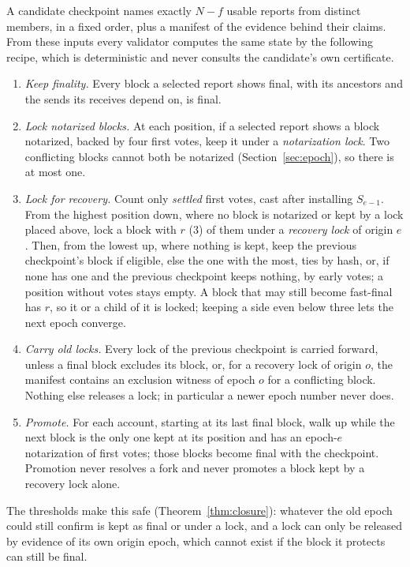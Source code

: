 A candidate checkpoint names exactly $N-f$ usable reports from distinct members, in a fixed order, plus a manifest of the evidence behind their claims. From these inputs every validator computes the same state by the following recipe, which is deterministic and never consults the candidate's own certificate.
\begin{enumerate}
\item \emph{Keep finality.} Every block a selected report shows final, with its ancestors and the sends its receives depend on, is final.
\item \emph{Lock notarized blocks.} At each position, if a selected report shows a block notarized, backed by four first votes, keep it under a \emph{notarization lock}. Two conflicting blocks cannot both be notarized (Section~\ref{sec:epoch}), so there is at most one.
\item \emph{Lock for recovery.} Count only \emph{settled} first votes, cast after installing $S_{e-1}$. From the highest position down, where no block is notarized or kept by a lock placed above, lock a block with $r$ (3) of them under a \emph{recovery lock} of origin $e$. Then, from the lowest up, where nothing is kept, keep the previous checkpoint's block if eligible, else the one with the most, ties by hash, or, if none has one and the previous checkpoint keeps nothing, by early votes; a position without votes stays empty. A block that may still become fast-final has $r$, so it or a child of it is locked; keeping a side even below three lets the next epoch converge.
\item \emph{Carry old locks.} Every lock of the previous checkpoint is carried forward, unless a final block excludes its block, or, for a recovery lock of origin $o$, the manifest contains an exclusion witness of epoch $o$ for a conflicting block. Nothing else releases a lock; in particular a newer epoch number never does.
\item \emph{Promote.} For each account, starting at its last final block, walk up while the next block is the only one kept at its position and has an epoch-$e$ notarization of first votes; those blocks become final with the checkpoint. Promotion never resolves a fork and never promotes a block kept by a recovery lock alone.
\end{enumerate}
The thresholds make this safe (Theorem~\ref{thm:closure}): whatever the old epoch could still confirm is kept as final or under a lock, and a lock can only be released by evidence of its own origin epoch, which cannot exist if the block it protects can still be final.

